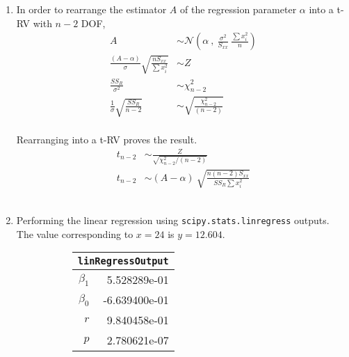 \begin{enumerate}
\item In order to rearrange the estimator $ A $ of the regression parameter $ \alpha $ into a t-RV with $ n-2 $ DOF, \\

\begin{align}
	A &\sim \mathcal{N}\left(\alpha\ ,\ \frac{\sigma^2}{S_{xx}}\ \frac{\sum x_i^2}{n}\right) \nonumber \\
	\frac{(A - \alpha)}{\sigma} \sqrt{\frac{nS_{xx}}{\sum x_i^2}} &\sim Z \\ 
	\frac{SS_R}{\sigma^2} &\sim \chi^2_{n-2} \nonumber \\
	\frac{1}{\sigma} \sqrt{\frac{SS_R}{n-2}} &\sim \sqrt{\frac{\chi^2_{n-2}}{(n-2)}}
\end{align}\\

Rearranging into a t-RV proves the result.\\

\begin{align}
	t_{n-2} &\sim \frac{Z}{\sqrt{\chi^2_{n-2} / (n-2)}} \nonumber \\
	t_{n-2} &\sim (A - \alpha)\ \sqrt{\frac{n(n-2)S_{xx}}{SS_R \sum x_i^2}}
\end{align}\\

\item Performing the linear regression using \texttt{scipy.stats.linregress} outputs. \\
The value corresponding to $ x = 24 $ is $ y = 12.604 $.\\

\begin{figure}[H]
	\begin{subfigure}[]{0.2\linewidth}
		\centering
		\begin{tabular}{@{}rr@{}}
			\toprule
			\multicolumn{2}{c}{\texttt{linRegressOutput}} \\
			\midrule
			$\beta_1$     &     5.528289e-01 \\
			$\beta_0$ &    -6.639400e-01 \\
			$r$    &     9.840458e-01 \\
			$p$    &     2.780621e-07 \\
			\bottomrule
		\end{tabular}
		
	\end{subfigure}
	\begin{subfigure}[]{0.8\linewidth}
		\centering
		

\end{subfigure}
\end{figure}
\end{enumerate}
